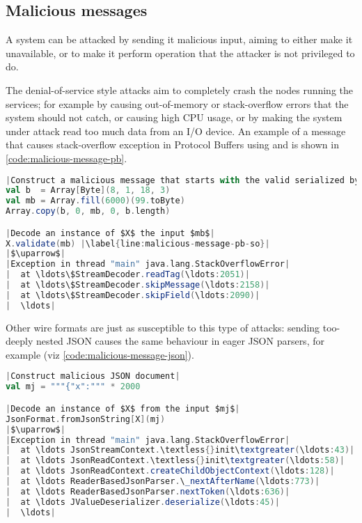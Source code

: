 
\subsection{Malicious messages}
A system can be attacked by sending it malicious input, aiming to either make it unavailable, or to make it perform operation that the attacker is not privileged to do. 

The denial-of-service style attacks aim to completely crash the nodes running the services; for example by causing out-of-memory or stack-overflow errors that the system should not catch, or causing high CPU usage, or by making the system under attack read too much data from an I/O device. An example of a message that causes stack-overflow exception in Protocol Buffers using  and \cite{scalapb} is shown in \autoref{code:malicious-message-pb}.

\begin{lstlisting}[caption={Malicious message}, label={code:malicious-message-pb}, language=Scala, escapechar=|]
|Construct a malicious message that starts with the valid serialized bytes $b$ and adds 6000 bytes with the value 99.|
val b  = Array[Byte](8, 1, 18, 3)
val mb = Array.fill(6000)(99.toByte)
Array.copy(b, 0, mb, 0, b.length)

|Decode an instance of $X$ the input $mb$|
X.validate(mb) |\label{line:malicious-message-pb-so}|
|$\uparrow$|
|Exception in thread "main" java.lang.StackOverflowError|
|  at \ldots\$StreamDecoder.readTag(\ldots:2051)|
|  at \ldots\$StreamDecoder.skipMessage(\ldots:2158)|
|  at \ldots\$StreamDecoder.skipField(\ldots:2090)|
|  \ldots|
\end{lstlisting}

Other wire formats are just as susceptible to this type of attacks: sending too-deeply nested JSON causes the same behaviour in eager JSON parsers, for example  (viz \autoref{code:malicious-message-json}).

\begin{lstlisting}[caption={Malicious message}, label={code:malicious-message-json}, language=Scala, escapechar=|]
|Construct malicious JSON document|
val mj = """{"x":""" * 2000

|Decode an instance of $X$ from the input $mj$|
JsonFormat.fromJsonString[X](mj)
|$\uparrow$|
|Exception in thread "main" java.lang.StackOverflowError|
|  at \ldots JsonStreamContext.\textless{}init\textgreater(\ldots:43)|
|  at \ldots JsonReadContext.\textless{}init\textgreater(\ldots:58)|
|  at \ldots JsonReadContext.createChildObjectContext(\ldots:128)|
|  at \ldots ReaderBasedJsonParser.\_nextAfterName(\ldots:773)|
|  at \ldots ReaderBasedJsonParser.nextToken(\ldots:636)|
|  at \ldots JValueDeserializer.deserialize(\ldots:45)|
|  \ldots|
\end{lstlisting}

